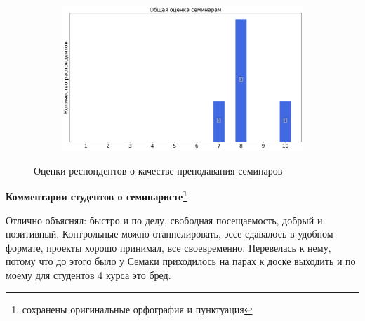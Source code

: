 \begin{figure}[H]
\begin{subfigure}[b]{0.45\textwidth}
			\end{subfigure}
			\begin{subfigure}[b]{0.45\textwidth}
				\centering
				\includegraphics[width=\textwidth]{images/4 course/Защита информации/seminarists-marks-Аршанский А.Р.-3.png}
			\end{subfigure}	
			\caption{Оценки респондентов о качестве преподавания семинаров}
		\end{figure}

		\textbf{Комментарии студентов о семинаристе\protect\footnote{сохранены оригинальные орфография и пунктуация}}
            \begin{commentbox} 
                Отлично объяснял: быстро и по делу, свободная посещаемость, добрый и позитивный. Контрольные можно отаппелировать, эссе сдавалось в удобном формате, проекты хорошо принимал, все своевременно. Перевелась к нему, потому что до этого было у Семаки приходилось на парах к доске выходить и по моему для студентов 4 курса это бред. 
            \end{commentbox} 

              
